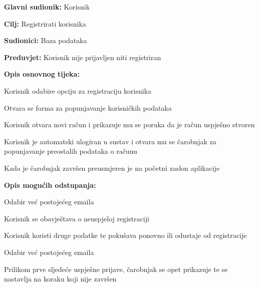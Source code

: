 \noindent {}
\begin{packed_item}

	\item \textbf{Glavni sudionik:} Korisnik
	\item  \textbf{Cilj:} Registrirati korisnika
	\item  \textbf{Sudionici:} Baza podataka
	\item  \textbf{Preduvjet:} Korisnik nije prijavljen niti registriran
	\item  \textbf{Opis osnovnog tijeka:}
	
	\item[] \begin{packed_enum}
		
		\item Korisnik odabire opciju za registraciju korisnika
		\item Otvara se forma za popunjavanje korisničkih podataka
		\item Korisnik otvara novi račun i prikazuje mu se poruka da je račun uspješno stvoren
		\item Korisnik je automatski ulogiran u sustav i otvara mu se čarobnjak za popunjavanje preostalih podataka o računu
		\item Kada je čarobnjak završen preusmjeren je na početni zaslon aplikacije

	\end{packed_enum}

	\item  \textbf{Opis mogućih odstupanja:}
	
	\item[] \begin{packed_item}
	
		\item[3.a] Odabir već postojećeg emaila
		\item[] \begin{packed_enum}
			
			\item Korisnik se obavještava o neuspjeloj registraciji
			\item Korisnik koristi druge podatke te pokušava ponovno ili odustaje od registracije
			
		\end{packed_enum}
		
		\item[4.a] Odabir već postojećeg emaila
		\item[] \begin{packed_enum}
			
			\item Prilikom prve sljedeće uspješne prijave, čarobnjak se opet prikazuje te se nastavlja na koraku koji nije završen
			
		\end{packed_enum}
		
	\end{packed_item}
\end{packed_item}

